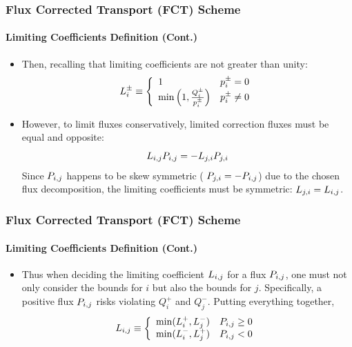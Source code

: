 \documentclass{beamer}
\begin{document}
\begin{frame}
\frametitle{Flux Corrected Transport (FCT) Scheme}
\framesubtitle{Limiting Coefficients Definition (Cont.)}

\begin{itemize}
   \item Then, recalling that limiting coefficients are not greater than unity:
      \begin{equation}
         L_i^\pm \equiv\left\{
            \begin{array}{l l}
               1                                          & p_i^\pm = 0\\
               \min\left(1,\frac{Q_i^\pm}{p_i^\pm}\right) & p_i^\pm \ne 0
            \end{array}
            \right.
      \end{equation}
   \item However, to limit fluxes conservatively, limited correction fluxes must
      be equal and opposite:
      \begin{equation}
         L\ij \correctionfluxij = -L_{j,i} \MakeUppercase{\correctionfluxletter}_{j,i}
      \end{equation}
      Since $\correctionfluxij$ happens to be skew symmetric (
      $\MakeUppercase{\correctionfluxletter}_{j,i}=-\correctionfluxij$) due to the
      chosen flux decomposition, the limiting coefficients must be symmetric:
      $L_{j,i} = L_{i,j}$.
\end{itemize}

\end{frame}
\begin{frame}
\frametitle{Flux Corrected Transport (FCT) Scheme}
\framesubtitle{Limiting Coefficients Definition (Cont.)}

\begin{itemize}
   \item Thus when deciding the limiting coefficient $L_{i,j}$ for a flux $\correctionfluxij$, 
      one must not only consider the bounds for $i$ but also the bounds for $j$.
      Specifically, a positive flux $\correctionfluxij$ risks violating $Q_i^+$ and $Q_j^-$.
      Putting everything together,
      \begin{equation}
         L\ij \equiv\left\{
            \begin{array}{l l}
               \min(L_i^+,L_j^-) & \correctionfluxij \geq 0\\
               \min(L_i^-,L_j^+) & \correctionfluxij < 0
            \end{array}
            \right.
      \end{equation}
\end{itemize}

\end{frame}
\end{document}
